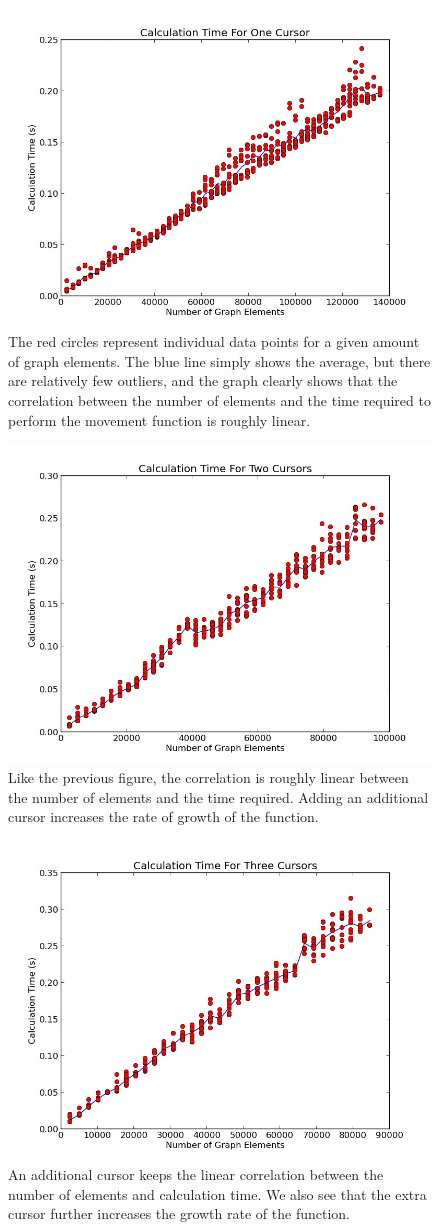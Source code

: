 \begin{figure}[htp] \centering
    \includegraphics[width=0.60\linewidth]{img/one_mouse_move.jpg}
    \caption[Graph Magnification Calculation Time for One Cursor]{The red circles represent individual data points for a given amount of graph elements. The blue line simply shows the average, but there are relatively few outliers, and the graph clearly shows that the correlation between the number of elements and the time required to perform the movement function is roughly linear.}
    \label{fig:one_mouse_data}
\end{figure}
\begin{figure} \centering
    \includegraphics[width=0.60\linewidth]{img/two_mouse_move.jpg}
    \caption[Graph Magnification Calculation Time for Two Cursors]{Like the previous figure, the correlation is roughly linear between the number of elements and the time required. Adding an additional cursor increases the rate of growth of the function.}
    \label{fig:two_mouse_data}
\end{figure}
\begin{figure}[htp] \centering
    \includegraphics[width=0.60\linewidth]{img/three_mouse_move.jpg}
    \caption[Graph Magnification Calculation Time for Three Cursors]{An additional cursor keeps the linear correlation between the number of elements and calculation time. We also see that the extra cursor further increases the growth rate of the function.}
    \label{fig:three_mouse_data}
\end{figure}

